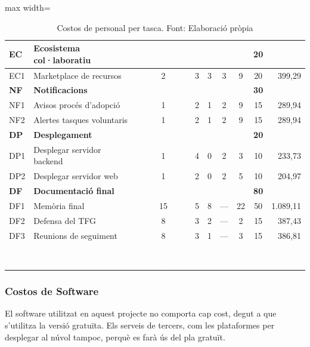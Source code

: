 \documentclass[11pt,a4paper]{report}
\begin{document}
\begin{table}[H]
\begin{adjustbox}{max width=\textwidth}
\begin{tabular}{|l|l|c|c|c|c|c|c|r|}
        \rowcolor{gray!20}
        \textbf{EC} & \textbf{Ecosistema col·laboratiu} & & & & & & \textbf{20} & \\
        \hline
        EC1  & Marketplace de recursos             &  2 & 3 & 3 &  3 &  9 & 20 & 399,29 \\
        \hline

        \rowcolor{gray!20}
        \textbf{NF} & \textbf{Notificacions} & & & & & & \textbf{30} & \\
        \hline
        NF1  & Avisos procés d'adopció             &  1 & 2 & 1 &  2 &  9 & 15 & 289,94 \\
        \hline
        NF2  & Alertes tasques voluntaris          &  1 & 2 & 1 &  2 &  9 & 15 & 289,94 \\
        \hline

        \rowcolor{gray!20}
        \textbf{DP} & \textbf{Desplegament} & & & & & & \textbf{20} & \\
        \hline
        DP1  & Desplegar servidor backend          &  1 & 4 & 0 &  2 &  3 & 10 & 233,73 \\
        \hline
        DP2  & Desplegar servidor web              &  1 & 2 & 0 &  2 &  5 & 10 & 204,97 \\
        \hline

        \rowcolor{gray!20}
        \textbf{DF} & \textbf{Documentació final} & & & & & & \textbf{80} & \\
        \hline
        DF1  & Memòria final                       & 15 & 5 & 8 & --- & 22 & 50 & 1.089,11 \\
        \hline
        DF2  & Defensa del TFG                     &  8 & 3 & 2 & --- &  2 & 15 & 387,43 \\
        \hline
        DF3  & Reunions de seguiment               &  8 & 3 & 1 & --- &  3 & 15 & 386,81 \\
        \hline

        \rowcolor{oceanblue}
        \multicolumn{7}{|l|}{\textcolor{white}{\textbf{Total}}} &
        \textcolor{white}{\textbf{540 h}} &
        \textcolor{white}{\textbf{11.232,05 €}} \\
        \hline
    \end{tabular}
    \end{adjustbox}
    \caption[Costos de personal per tasca]{Costos de personal per tasca. Font: Elaboració pròpia}
    \label{tab:costos_personal}
\end{table}

\subsubsection{Costos de Software}
El software utilitzat en aquest projecte no comporta cap cost, degut a que s’utilitza la versió gratuïta. Els serveis de tercers, com les plataformes per desplegar al núvol tampoc, perquè es farà ús del pla gratuït.
\end{document}
